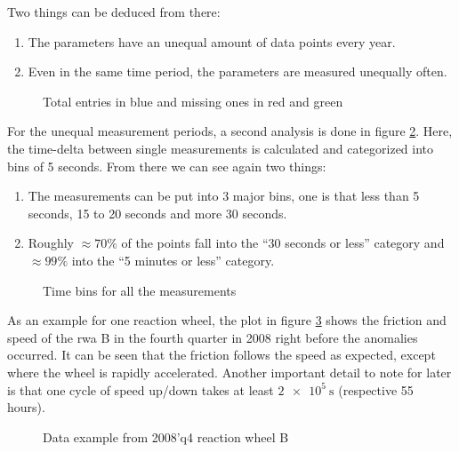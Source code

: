 Two things can be deduced from there:

\begin{enumerate}
\item The parameters have an unequal amount of data points every year.
\item Even in the same time period, the parameters are measured unequally often.
\end{enumerate}

\begin{figure}[htb]
\centering

\caption{Total entries in blue and missing ones in red and green}
\label{f:rwa_missing_chart}
\end{figure}

For the unequal measurement periods, a second analysis is done in figure \ref{f:rwa_time_bin}. Here, the time-delta between single measurements is calculated and categorized into bins of 5 seconds. From there we can see again two things:

\begin{enumerate}
\item The measurements can be put into 3 major bins, one is that  less than 5 seconds, 15 to 20 seconds and more 30 seconds.
\item Roughly $\approx 70\%$ of the points fall into the \enquote{30 seconds or less} category and $\approx 99\%$ into the \enquote{5 minutes or less} category.
\end{enumerate}

\begin{figure}[htb]
\centering

\caption{Time bins for all the measurements}
\label{f:rwa_time_bin}
\end{figure}

As an example for one reaction wheel, the plot in figure \ref{f:rwa_example} shows the friction and speed of the \ac{rwa} B in the fourth quarter in 2008 right before the anomalies occurred. It can be seen that the friction follows the speed as expected, except where the wheel is rapidly accelerated. \newline
Another important detail to note for later is that one cycle of speed up/down takes at least $\SI{2e5}{\second}$ (respective 55 hours).

\begin{figure}[H]
\centering

\caption{Data example from 2008'q4 reaction wheel B}
\label{f:rwa_example}
\end{figure}

